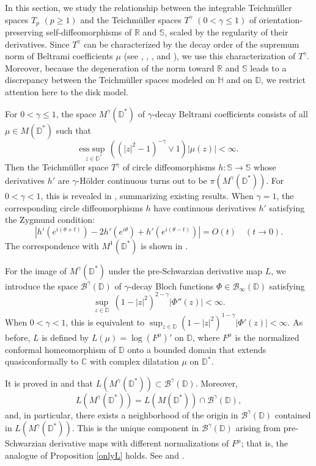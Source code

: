 \documentclass[amstex,12pt,reqno]{amsart}
\theoremstyle{definition}
\begin{document}
In this section, we study the relationship between the integrable Teich\-m\"ul\-ler spaces $T_p$ $(p \geq 1)$
and the Teich\-m\"ul\-ler spaces $T^\gamma$ $(0<\gamma \leq 1)$ of 
orientation-preserving self-diffeomorphisms of $\mathbb R$ and $\mathbb S$, scaled by the regularity of their derivatives.
Since $T^\gamma$ can be characterized by the decay order of the supremum norm of Beltrami coefficients $\mu$ 
(see \cite{Ma2}, \cite{Ma3}, \cite{TW1}, and \cite{TW2}), 
we use this characterization of $T^\gamma$. 
Moreover, because the degeneration of the norm toward $\mathbb R$ and $\mathbb S$ leads to a discrepancy between the Teich\-m\"ul\-ler spaces modeled on $\mathbb H$ and on $\mathbb D$, we restrict attention here to the disk model.

For $0 <\gamma \leq 1$, the space $M^\gamma(\mathbb D^*)$ of $\gamma$-decay
Beltrami coefficients consists of all $\mu \in M(\mathbb D^*)$ such that 
$$
\underset{\ z \in \mathbb D^*}{\mathrm{ess}\sup}\,((|z|^2-1)^{-\gamma} \vee 1)|\mu(z)|<\infty.
$$
Then the Teich\-m\"ul\-ler space $T^\gamma$ of circle diffeomorphisms $h:\mathbb S \to \mathbb S$ whose derivatives $h'$ are
$\gamma$-H\"older continuous turns out to be $\pi(M^\gamma(\mathbb D^*))$. 
For $0<\gamma <1$, this is revealed in \cite[Theorems 1.1, 6.7]{Ma2}, summarizing existing results.
When $\gamma=1$, the corresponding circle diffeomorphisms $h$  
have continuous derivatives $h'$
satisfying the Zygmund condition:
$$
|h'(e^{i(\theta+t)})-2h'(e^{i\theta})+h'(e^{i(\theta-t)})| =O(t) \quad (t \to 0).
$$
The correspondence with $M^1(\mathbb D^*)$ is shown in \cite[Theorem 1.1]{TW1}.

For the image of $M^\gamma(\mathbb D^*)$ under the pre-Schwarzian derivative map $L$, we introduce the space 
${\mathcal B}^\gamma(\mathbb D)$ of $\gamma$-decay Bloch functions $\Phi \in \mathcal B_\infty(\mathbb D)$
satisfying 
$$
\sup_{z \in \mathbb D}\ (1-|z|^2)^{2-\gamma}|\Phi''(z)|<\infty.
$$
When $0<\gamma<1$, this is equivalent to
$\sup_{z \in \mathbb D}(1-|z|^2)^{1-\gamma}|\Phi'(z)|<\infty$. 
As before, $L$ is defined by $L(\mu)=\log (F^\mu)'$ on $\mathbb D$, 
where $F^\mu$ is the normalized conformal homeomorphism of $\mathbb D$ onto a bounded domain that
extends quasiconformally to
$\mathbb C$ with complex dilatation $\mu$ on
$\mathbb D^*$. 

It is proved in \cite[Theorem 4.6]{Ma2} and \cite[Theorem 1.1]{TW1} that 
$L(M^\gamma(\mathbb D^*)) \subset {\mathcal B}^\gamma(\mathbb D)$.
Moreover,
\begin{equation}\label{L-property}
L(M^\gamma(\mathbb D^*))=L(M(\mathbb D^*)) \cap {\mathcal B}^\gamma(\mathbb D),
\end{equation}
and, in particular, there exists a neighborhood of the origin in ${\mathcal B}^\gamma(\mathbb D)$ contained in
$L(M^\gamma(\mathbb D^*))$.
This is the unique component in ${\mathcal B}^\gamma(\mathbb D)$ arising from pre-Schwarzian derivative maps 
with different normalizations of $F^\mu$; that is, the analogue of Proposition \ref{onlyL} holds.
See \cite[Theorem 1.3]{TW1} and \cite[Theorem 1.1]{TW2}.
\end{document}
